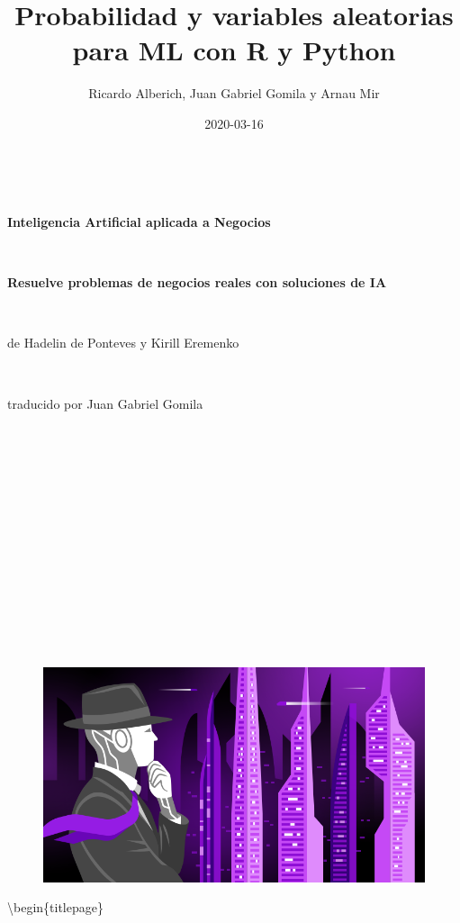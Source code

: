 \documentclass[]{book}
\title{Probabilidad y variables aleatorias para ML con R y Python}
\author{Ricardo Alberich, Juan Gabriel Gomila y Arnau Mir}
\date{2020-03-16}
\begin{document}
\maketitle


\begin{titlepage}

\begin{center}

\

\Huge \textbf{Inteligencia Artificial aplicada a Negocios}

\

\Large \textbf{Resuelve problemas de negocios reales con soluciones de IA}

\

\large de Hadelin de Ponteves y Kirill Eremenko

\

\large traducido por Juan Gabriel Gomila


\end{center}

\

\

\

\

\

\

\

\

\begin{figure}[!htbp]
		\begin{center}
			\includegraphics[scale=0.6]{Course_Image.png}
		\end{center}
\end{figure}

\end{titlepage}

{
\setcounter{tocdepth}{1}
\tableofcontents
}
\textbackslash{}begin\{titlepage\}
\end{document}

